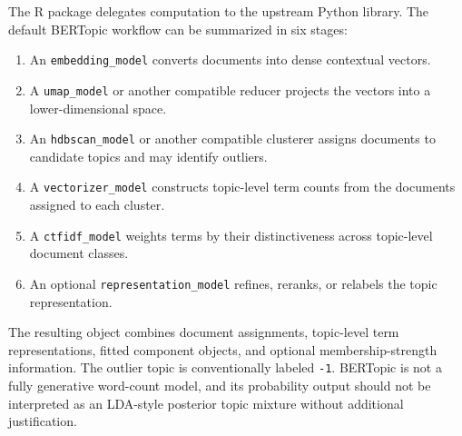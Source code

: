 \documentclass[12pt]{article}
\newcommand{\code}[1]{\texttt{#1}}
\begin{document}
The R package delegates computation to the upstream Python library. The default BERTopic workflow can be summarized in six stages:

\begin{enumerate}
    \item An \code{embedding\_model} converts documents into dense contextual vectors.
    \item A \code{umap\_model} or another compatible reducer projects the vectors into a lower-dimensional space.
    \item An \code{hdbscan\_model} or another compatible clusterer assigns documents to candidate topics and may identify outliers.
    \item A \code{vectorizer\_model} constructs topic-level term counts from the documents assigned to each cluster.
    \item A \code{ctfidf\_model} weights terms by their distinctiveness across topic-level document classes.
    \item An optional \code{representation\_model} refines, reranks, or relabels the topic representation.
\end{enumerate}

The resulting object combines document assignments, topic-level term representations, fitted component objects, and optional membership-strength information. The outlier topic is conventionally labeled \code{-1}. BERTopic is not a fully generative word-count model, and its probability output should not be interpreted as an LDA-style posterior topic mixture without additional justification.
\end{document}
